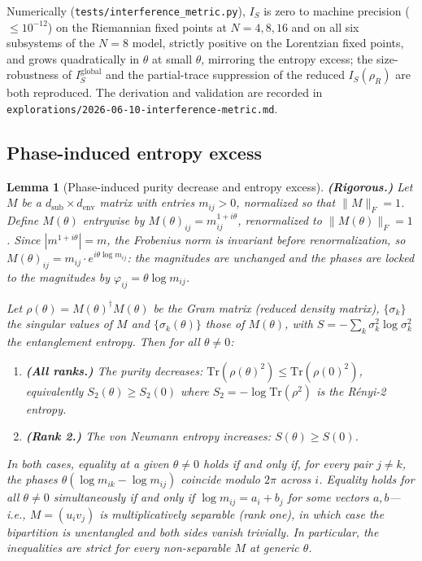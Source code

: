 \documentclass[12pt,a4paper]{article}
\newtheorem{lemma}{Lemma}
\theoremstyle{definition}
\theoremstyle{remark}
\begin{document}
Numerically (\texttt{tests/interference\_metric.py}), $I_S$ is zero to
machine precision ($\leq 10^{-12}$) on the Riemannian fixed points at
$N = 4, 8, 16$ and on all six subsystems of the $N=8$ model, strictly
positive on the Lorentzian fixed points, and grows quadratically in
$\theta$ at small $\theta$, mirroring the entropy excess; the
size-robustness of $I_S^{\mathrm{global}}$ and the partial-trace
suppression of the reduced $I_S(\rho_R)$ are both reproduced. The
derivation and validation are recorded in
\texttt{explorations/2026-06-10-interference-metric.md}.

\subsection{Phase-induced entropy excess}
\label{sec:entropy_excess}

\begin{lemma}[Phase-induced purity decrease and entropy excess]
\textbf{(Rigorous.)}
\label{lem:entropy_excess}
Let $M$ be a $d_{\mathrm{sub}} \times d_{\mathrm{env}}$ matrix with
entries $m_{ij} > 0$, normalized so that $\|M\|_F = 1$. Define
$M(\theta)$ entrywise by $M(\theta)_{ij} = m_{ij}^{1 + i\theta}$,
renormalized to $\|M(\theta)\|_F = 1$. Since $|m^{1+i\theta}| = m$,
the Frobenius norm is invariant before renormalization, so
$M(\theta)_{ij} = m_{ij} \cdot e^{i\theta \log m_{ij}}$: the
magnitudes are unchanged and the phases are locked to the magnitudes by
$\varphi_{ij} = \theta \log m_{ij}$.

Let $\rho(\theta) = M(\theta)^\dagger M(\theta)$ be the Gram matrix
(reduced density matrix), $\{\sigma_k\}$ the singular values of $M$
and $\{\sigma_k(\theta)\}$ those of $M(\theta)$, with $S = -\sum_k
\sigma_k^2 \log \sigma_k^2$ the entanglement entropy. Then for all
$\theta \neq 0$:
\begin{enumerate}
\item[(a)] \textbf{(All ranks.)} The purity decreases:
$\mathrm{Tr}(\rho(\theta)^2) \leq \mathrm{Tr}(\rho(0)^2)$,
equivalently $S_2(\theta) \geq S_2(0)$ where $S_2 = -\log
\mathrm{Tr}(\rho^2)$ is the R\'enyi-2 entropy.
\item[(b)] \textbf{(Rank 2.)} The von Neumann entropy increases:
$S(\theta) \geq S(0)$.
\end{enumerate}
In both cases, equality at a given $\theta \neq 0$ holds if and only
if, for every pair $j \neq k$, the phases $\theta(\log m_{ik} - \log
m_{ij})$ coincide modulo $2\pi$ across $i$. Equality holds for
\emph{all} $\theta \neq 0$ simultaneously if and only if $\log m_{ij}
= a_i + b_j$ for some vectors $a, b$---i.e., $M = (u_i v_j)$ is
multiplicatively separable (rank one), in which case the bipartition
is unentangled and both sides vanish trivially. In particular, the
inequalities are strict for every non-separable $M$ at generic
$\theta$.
\end{lemma}
\end{document}

